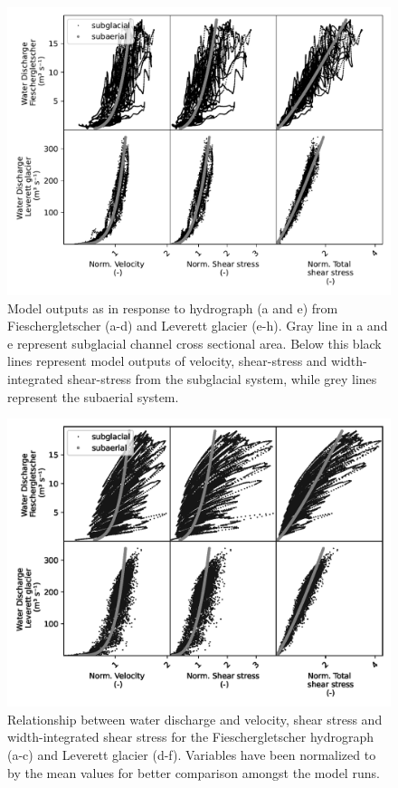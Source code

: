 \documentclass[draft]{agujournal2019}
\begin{document}
\begin{center}
  \begin{figure}[H]
    \includegraphics[width=0.8\linewidth]{model_outputs.pdf}
    \caption{Model outputs as in response to hydrograph (a and e) from Fieschergletscher (a-d) and Leverett glacier (e-h). Gray line in a and e represent subglacial channel cross sectional area. Below this black lines represent model outputs of velocity, shear-stress and width-integrated shear-stress from the subglacial system, while grey lines represent the subaerial system. } 
    \label{fig:model_outs}
  \end{figure}
\end{center}


\begin{center}
  \begin{figure}[H]
    \includegraphics[width=0.8\linewidth]{Qw_vari.png}
    \caption{Relationship between water discharge and velocity, shear stress and width-integrated shear stress for the Fieschergletscher hydrograph (a-c) and Leverett glacier (d-f). Variables have been normalized to by the mean values for better comparison amongst the model runs.} 
    \label{fig:Qw_vari}
  \end{figure}
\end{center}
\end{document}
